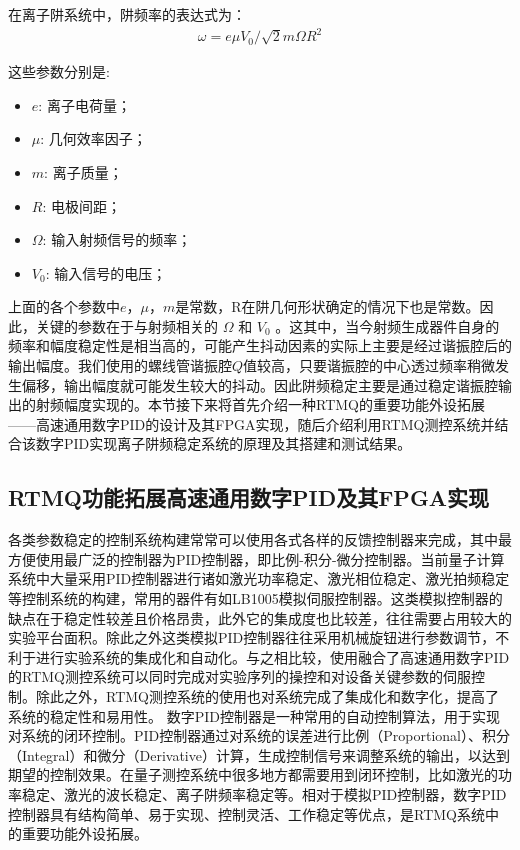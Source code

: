 在离子阱系统中，阱频率的表达式为：
\begin{align}
    \omega=e\mu V_0/\sqrt{2}m\Omega R^2 \label{eq:trap_frequency}
\end{align}

这些参数分别是:
\begin{itemize}
    \item $e$: 离子电荷量；
    \item $\mu$: 几何效率因子；
    \item $m$: 离子质量；
    \item $R$: 电极间距；
    \item $\Omega$: 输入射频信号的频率；
    \item $V_0$: 输入信号的电压；
\end{itemize}


上面的各个参数中$e$，$\mu$，$m$是常数，R在阱几何形状确定的情况下也是常数。因此，关键的参数在于与射频相关的 $\Omega$ 和 $V_0$ 。这其中，当今射频生成器件自身的频率和幅度稳定性是相当高的，可能产生抖动因素的实际上主要是经过谐振腔后的输出幅度。我们使用的螺线管谐振腔$Q$值较高，只要谐振腔的中心透过频率稍微发生偏移，输出幅度就可能发生较大的抖动。因此阱频稳定主要是通过稳定谐振腔输出的射频幅度实现的。本节接下来将首先介绍一种RTMQ的重要功能外设拓展——高速通用数字PID的设计及其FPGA实现，随后介绍利用RTMQ测控系统并结合该数字PID实现离子阱频稳定系统的原理及其搭建和测试结果。

\subsection[RTMQ功能拓展高速通用数字PID及其FPGA实现]{RTMQ功能拓展高速通用数字PID及其FPGA实现\label{section:digital_pid}}

各类参数稳定的控制系统构建常常可以使用各式各样的反馈控制器来完成，其中最方便使用最广泛的控制器为PID控制器，即比例-积分-微分控制器。当前量子计算系统中大量采用PID控制器进行诸如激光功率稳定、激光相位稳定、激光拍频稳定等控制系统的构建，常用的器件有如LB1005模拟伺服控制器。这类模拟控制器的缺点在于稳定性较差且价格昂贵，此外它的集成度也比较差，往往需要占用较大的实验平台面积。除此之外这类模拟PID控制器往往采用机械旋钮进行参数调节，不利于进行实验系统的集成化和自动化。与之相比较，使用融合了高速通用数字PID的RTMQ测控系统可以同时完成对实验序列的操控和对设备关键参数的伺服控制。除此之外，RTMQ测控系统的使用也对系统完成了集成化和数字化，提高了系统的稳定性和易用性。
数字PID控制器是一种常用的自动控制算法，用于实现对系统的闭环控制。PID控制器通过对系统的误差进行比例（Proportional）、积分（Integral）和微分（Derivative）计算，生成控制信号来调整系统的输出，以达到期望的控制效果。在量子测控系统中很多地方都需要用到闭环控制，比如激光的功率稳定、激光的波长稳定、离子阱频率稳定等。相对于模拟PID控制器，数字PID控制器具有结构简单、易于实现、控制灵活、工作稳定等优点，是RTMQ系统中的重要功能外设拓展。

